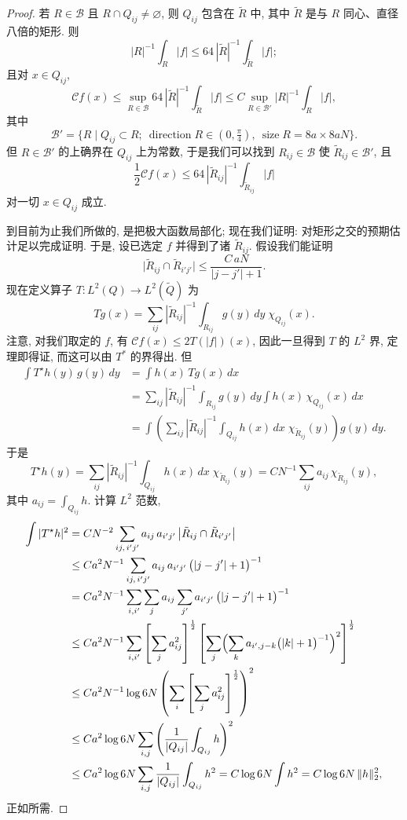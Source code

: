 \begin{proof}
若 $R\in\mathcal{B}$ 且 $R\cap Q_{ij}\neq\varnothing$, 则 $Q_{ij}$ 包含在 $\tilde{R}$ 中, 其中 $\tilde{R}$ 是与 $R$ 同心、直径八倍的矩形. 则
\[
|R|^{-1}\int_{R}|f|\leq 64\,|\tilde{R}|^{-1}\int_{\tilde{R}}|f|;
\]
且对 $x\in Q_{ij}$,
\[
\mathcal{C}f(x)\leq\sup_{R\in\mathcal{B}}64\,|\tilde{R}|^{-1}\int_{\tilde{R}}|f|
\leq C\sup_{R\in\mathcal{B}'}|R|^{-1}\int_{R}|f|,
\]
其中
\[
\mathcal{B}'=\{R \mid Q_{ij}\subset R;\ \operatorname{direction}R\in(0,\tfrac{\pi}{4}),\ \operatorname{size}R=8a\times 8aN\}.
\]
但 $R\in\mathcal{B}'$ 的上确界在 $Q_{ij}$ 上为常数, 于是我们可以找到 $R_{ij}\in\mathcal{B}$ 使 $\tilde{R}_{ij}\in\mathcal{B}'$, 且
\[
\frac{1}{2}\mathcal{C}f(x)\leq 64\,|\tilde{R}_{i j}|^{-1}\int_{\tilde{R}_{i j}}|f|
\]
对一切 $x\in Q_{ij}$ 成立.

到目前为止我们所做的, 是把极大函数局部化; 现在我们证明: 对矩形之交的预期估计足以完成证明. 于是, 设已选定 $f$ 并得到了诸 $\tilde{R}_{ij}$. 假设我们能证明
\[
\bigl|\tilde{R}_{i j}\cap\tilde{R}_{i' j'}\bigr|\leq\frac{C\,aN}{|j-j'|+1}.
\]
现在定义算子 $T:L^2(Q)\to L^2(\tilde{Q})$ 为
\[
Tg(x)=\sum_{ij}|\tilde{R}_{i j}|^{-1}\int_{R_{i j}}g(y)\,dy\;\chi_{Q_{i j}}(x).
\]
注意, 对我们取定的 $f$, 有 $\mathcal{C}f(x)\leq 2T(|f|)(x)$, 因此一旦得到 $T$ 的 $L^2$ 界, 定理即得证, 而这可以由 $T^{\ast}$ 的界得出. 但
\begin{align*}
\int T^{\star}h(y)\,g(y)\,dy&=\int h(x)\,Tg(x)\,dx \\
&=\sum_{ij}|\tilde{R}_{i j}|^{-1}\int_{R_{i j}}g(y)\,dy\int h(x)\,\chi_{Q_{i j}}(x)\,dx \\
&=\int\left(\sum_{ij}|\tilde{R}_{i j}|^{-1}\int_{Q_{i j}}h(x)\,dx\;\chi_{\tilde{R}_{i j}}(y)\right)g(y)\,dy.
\end{align*}
于是
\[
T^{\star}h(y)=\sum_{ij}|\tilde{R}_{i j}|^{-1}\int_{Q_{i j}}h(x)\,dx\;\chi_{\tilde{R}_{i j}}(y)
=C N^{-1}\sum_{ij}a_{ij}\,\chi_{\tilde{R}_{i j}}(y),
\]
其中 $a_{ij}=\int_{Q_{ij}}h$. 计算 $L^{2}$ 范数,
\begin{align*}
\int|T^{\star}h|^{2}
&=C N^{-2}\sum_{ij,\,i'j'}a_{ij}\,a_{i'j'}\,\bigl|\tilde{R}_{i j}\cap\tilde{R}_{i' j'}\bigr| \\
&\leq C a^{2}N^{-1}\sum_{ij,\,i'j'}a_{ij}\,a_{i'j'}\,\bigl(|j-j'|+1\bigr)^{-1} \\
&=C a^{2}N^{-1}\sum_{i,i'}\sum_{j}a_{ij}\sum_{j'}a_{i'j'}\,\bigl(|j-j'|+1\bigr)^{-1} \\
&\leq C a^{2}N^{-1}\sum_{i,i'}\left[\sum_{j}a_{ij}^{2}\right]^{\frac{1}{2}}
\left[\sum_{j}\Bigl(\sum_{k}a_{i',j-k}\bigl(|k|+1\bigr)^{-1}\Bigr)^{2}\right]^{\frac{1}{2}} \\
&\leq C a^{2}N^{-1}\log 6N\left(\sum_{i}\left[\sum_{j}a_{ij}^{2}\right]^{\frac{1}{2}}\right)^{2} \\
&\leq C a^{2}\log 6N\sum_{i,j}\left(\frac{1}{|Q_{ij}|}\int_{Q_{ij}}h\right)^{2} \\
&\leq C a^{2}\log 6N\sum_{i,j}\frac{1}{|Q_{ij}|}\int_{Q_{ij}}h^{2}
=C\log 6N\int h^{2}
=C\log 6N\,\|h\|_{2}^{2},
\end{align*}
正如所需.


\end{proof}
